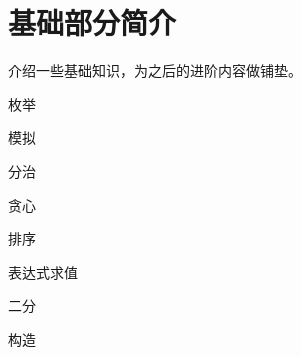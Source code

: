 
\section{基础部分简介}

介绍一些基础知识，为之后的进阶内容做铺垫。

\begin{todolist}
\item[\done] 枚举
\item[\done] 模拟
\item[\done] 分治
\item[\done] 贪心
\item[\done] 排序
\item[\done] 表达式求值
\item[\done] 二分
\item[\done] 构造
\end{todolist}

